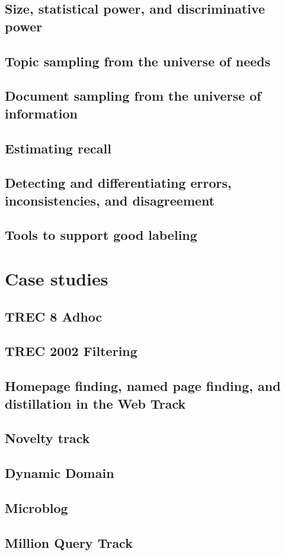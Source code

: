 \documentclass[nobib]{tufte-book}
\begin{document}
\section{Size, statistical power, and discriminative power}
\section{Topic sampling from the universe of needs}
\section{Document sampling from the universe of information}
\section{Estimating recall}
\section{Detecting and differentiating errors, inconsistencies, and disagreement}
\section{Tools to support good labeling}

\chapter{Case studies}

\section{TREC 8 Adhoc}
\section{TREC 2002 Filtering}
\section{Homepage finding, named page finding, and distillation in the Web Track}
\section{Novelty track}
\section{Dynamic Domain}
\section{Microblog}
\section{Million Query Track}



\backmatter

\printbibliography

\printindex
\end{document}
